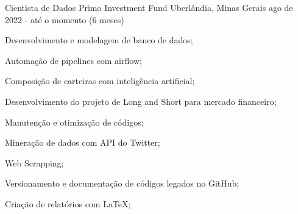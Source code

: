 \cventry
    {Cientista de Dados}
    {Primo Investment Fund}
    {Uberlândia, Minas Gerais}
    {ago de 2022 - até o momento (6 meses)}
    {
        \begin{cvitems}
            \item {
                Desenvolvimento e modelagem de banco de dados;
            }
            \item {
                Automação de pipelines com airflow;
            }
            \item {
                Composição de carteiras com inteligência artificial;
            }
            \item {
                Desenvolvimento do projeto de Long and Short para mercado financeiro;
            }
            \item {
                Manutenção e otimização de códigos;
            }
            \item {
                Mineração de dados com API do Twitter;
            }
            \item {
                Web Scrapping;
            }
            \item {
                Versionamento e documentação de códigos legados no GitHub;
            }
            \item {
                Criação de relatórios com LaTeX;
            }
        \end{cvitems}
    }
    {}
